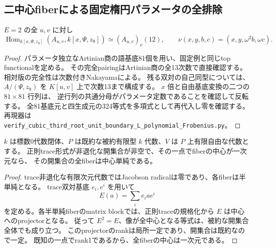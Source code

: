 \subsection{二中心fiberによる固定楕円パラメータの全排除}
\label{subsec:cubic-third-root-unit-boundary-L-open-obstruction}
\begin{proposition}[全変形の相対Frobenius双対]
$E=2$ の全 $u,v$ に対し
\[
 \operatorname{Hom}_{k[x,\Psi,z_9]}(A_{u,v},k[x,\Psi,z_9])
 \simeq (A_{u,v})_\nu(12),\qquad
 \nu(x,y,b,c)=(x,y,\omega^2b,\omega c).
\]
\end{proposition}
\begin{proof}
パラメータ独立なArtinian商の語基底81個を用い、固定例と同じtop functionalを定める。
その完全pairingはArtinian商の全13次数で直接確認する。
相対版の完全性は次数付きNakayamaによる。
残る双対の自己同型については、$A/(\Psi,z_9)$ を
$K[u,v]$ 上で次数13まで構成する。
$x$ 倍と自由基底変換の二つの $81\times81$ 行列は、
逆行列の共通分母がパラメータ定数であることを確認して反転する。
全81基底元と四生成元の324等式を多項式として再代入し零を確認する。
再現器は \texttt{verify\_cubic\_third\_root\_unit\_boundary\_L\_polynomial\_Frobenius.py}。
\end{proof}

\begin{lemma}[trace非退化開集合上の中心]
\label{lem:cubic-trace-open-center}
$k$ は標数0代数閉体、$P$ は既約な被約有限型 $k$ 代数、$V$ は $P$ 上有限自由な代数とする。
正則trace形式が非退化な開集合が非空で、その一点でfiberの中心が一次元なら、
その開集合の全fiberは中心単純である。
\end{lemma}
\begin{proof}
trace非退化な有限次元代数ではJacobson radicalは零であり、各fiberは半単純となる。
trace双対基底 $e_i,e^i$ を用いて
\[
 E(a)=\sum_i e_i a e^i
\]
を定める。各半単純fiberのmatrix blockでは、正則traceの規格化から
$E$ は中心へのprojectorとなる。
従って $E^2=E$、像が全中心となる等式は、被約な開集合全体でも成り立つ。
このprojectorのrankは局所一定であり、開集合は既約なので一定。
既知の一点でrank1であるから、全fiberの中心は一次元である。
\end{proof}

